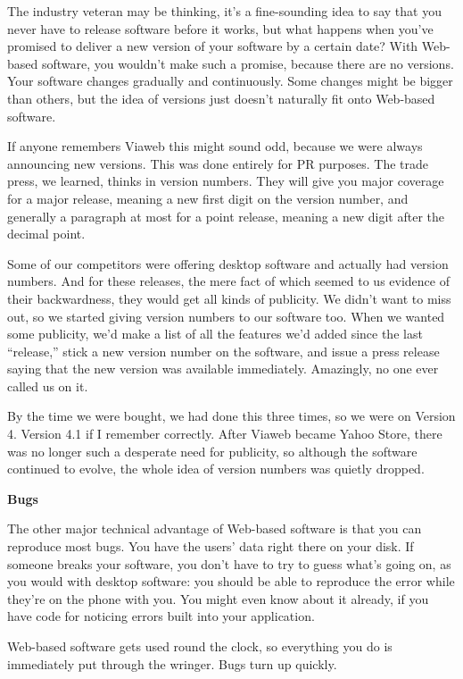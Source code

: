 \documentclass[12pt]{book}
\begin{document}
The industry veteran may be thinking, it's a fine-sounding idea to say
that you never have to release software before it works, but what
happens when you've promised to deliver a new version of your software
by a certain date? With Web-based software, you wouldn't make such a
promise, because there are no versions. Your software changes gradually
and continuously. Some changes might be bigger than others, but the idea
of versions just doesn't naturally fit onto Web-based software.

If anyone remembers Viaweb this might sound odd, because we were always
announcing new versions. This was done entirely for PR purposes. The
trade press, we learned, thinks in version numbers. They will give you
major coverage for a major release, meaning a new first digit on the
version number, and generally a paragraph at most for a point release,
meaning a new digit after the decimal point.

Some of our competitors were offering desktop software and actually had
version numbers. And for these releases, the mere fact of which seemed
to us evidence of their backwardness, they would get all kinds of
publicity. We didn't want to miss out, so we started giving version
numbers to our software too. When we wanted some publicity, we'd make a
list of all the features we'd added since the last ``release,'' stick a
new version number on the software, and issue a press release saying
that the new version was available immediately. Amazingly, no one ever
called us on it.

By the time we were bought, we had done this three times, so we were on
Version 4. Version 4.1 if I remember correctly. After Viaweb became
Yahoo Store, there was no longer such a desperate need for publicity, so
although the software continued to evolve, the whole idea of version
numbers was quietly dropped.

\textbf{Bugs}

The other major technical advantage of Web-based software is that you
can reproduce most bugs. You have the users' data right there on your
disk. If someone breaks your software, you don't have to try to guess
what's going on, as you would with desktop software: you should be able
to reproduce the error while they're on the phone with you. You might
even know about it already, if you have code for noticing errors built
into your application.

Web-based software gets used round the clock, so everything you do is
immediately put through the wringer. Bugs turn up quickly.
\end{document}
